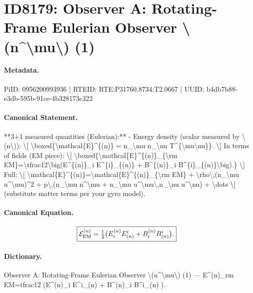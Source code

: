 \section*{ID8179: Observer A: Rotating-Frame Eulerian Observer \textbackslash{}(n\textasciicircum{}\textbackslash{}mu\textbackslash{}) (1)}
\paragraph{Metadata.}
PiID: 0956200993936 | RTEID: RTE:P31760.8734:T2.0667 | UUID: b4db7b88-e3db-595b-91ce-4b328173c322

\paragraph{Canonical Statement.}
**3+1 measured quantities (Eulerian):** - Energy density (scalar measured by \textbackslash{}(n\textbackslash{})): \textbackslash{}[ \textbackslash{}boxed\{\textbackslash{}mathcal\{E\}\textasciicircum{}\{(n)\} = n\_\textbackslash{}mu n\_\textbackslash{}nu T\textasciicircum{}\{\textbackslash{}mu\textbackslash{}nu\}\}. \textbackslash{}] In terms of fields (EM piece): \textbackslash{}[ \textbackslash{}boxed\{\textbackslash{}mathcal\{E\}\textasciicircum{}\{(n)\}\_\{\textbackslash{}rm EM\}=\textbackslash{}tfrac12\textbackslash{}big(E\textasciicircum{}\{(n)\}\_i E\textasciicircum{}\{i\}\_\{(n)\} + B\textasciicircum{}\{(n)\}\_i B\textasciicircum{}\{i\}\_\{(n)\}\textbackslash{}big).\} \textbackslash{}] Full: \textbackslash{}[ \textbackslash{}mathcal\{E\}\textasciicircum{}\{(n)\}=\textbackslash{}mathcal\{E\}\textasciicircum{}\{(n)\}\_\{\textbackslash{}rm EM\} + \textbackslash{}rho\textbackslash{},(n\_\textbackslash{}mu u\textasciicircum{}\textbackslash{}mu)\textasciicircum{}2 + p\textbackslash{},(n\_\textbackslash{}mu n\textasciicircum{}\textbackslash{}mu + n\_\textbackslash{}mu u\textasciicircum{}\textbackslash{}mu\textbackslash{},n\_\textbackslash{}nu u\textasciicircum{}\textbackslash{}nu) + \textbackslash{}dots \textbackslash{}] (substitute matter terms per your gyro model).

\paragraph{Canonical Equation.}
\[
\boxed{\mathcal{E}^{(n)}_{\rm EM}=\tfrac12\big(E^{(n)}_i E^{i}_{(n)} + B^{(n)}_i B^{i}_{(n)}\big).}
\]

\paragraph{Dictionary.}
Observer A: Rotating-Frame Eulerian Observer \textbackslash{}(n\textasciicircum{}\textbackslash{}mu\textbackslash{}) (1) — E\textasciicircum{}(n)\_rm EM=tfrac12 (E\textasciicircum{}(n)\_i E\textasciicircum{}i\_(n) + B\textasciicircum{}(n)\_i B\textasciicircum{}i\_(n) ).

